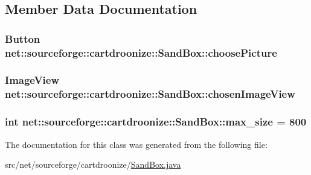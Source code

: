 \subsection{Member Data Documentation}
\hypertarget{classnet_1_1sourceforge_1_1cartdroonize_1_1SandBox_ad18a0605cce8fb6c4169ac1161834b8f}{
\subsubsection[{choosePicture}]{\setlength{\rightskip}{0pt plus 5cm}Button {\bf net::sourceforge::cartdroonize::SandBox::choosePicture}}}
\label{classnet_1_1sourceforge_1_1cartdroonize_1_1SandBox_ad18a0605cce8fb6c4169ac1161834b8f}
\hypertarget{classnet_1_1sourceforge_1_1cartdroonize_1_1SandBox_a58aae818b0555a62f51b2e6888c547fe}{
\subsubsection[{chosenImageView}]{\setlength{\rightskip}{0pt plus 5cm}ImageView {\bf net::sourceforge::cartdroonize::SandBox::chosenImageView}}}
\label{classnet_1_1sourceforge_1_1cartdroonize_1_1SandBox_a58aae818b0555a62f51b2e6888c547fe}
\hypertarget{classnet_1_1sourceforge_1_1cartdroonize_1_1SandBox_ad86695cd1381d71fbb82d9211d4ae901}{
\subsubsection[{max\_\-size}]{\setlength{\rightskip}{0pt plus 5cm}int {\bf net::sourceforge::cartdroonize::SandBox::max\_\-size} = 800}}
\label{classnet_1_1sourceforge_1_1cartdroonize_1_1SandBox_ad86695cd1381d71fbb82d9211d4ae901}


The documentation for this class was generated from the following file:\begin{DoxyCompactItemize}
\item 
src/net/sourceforge/cartdroonize/\hyperlink{SandBox_8java}{SandBox.java}\end{DoxyCompactItemize}

